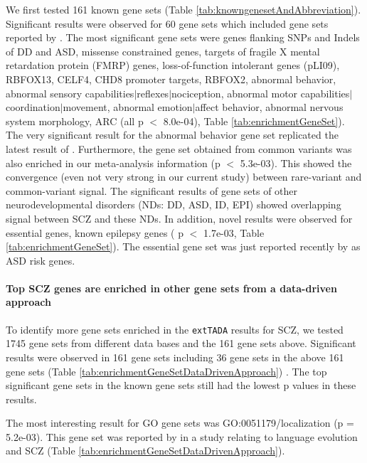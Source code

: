 \documentclass[]{article}
\begin{document}
We first tested 161 known gene sets
(Table \ref{tab:knowngenesetAndAbbreviation}).
Significant results
were observed for 60 gene sets which included gene sets reported by \cite{genovese2016increased}. The most significant gene sets were genes flanking SNPs
and Indels of DD and ASD, missense constrained genes, targets
of fragile X mental retardation protein (FMRP)
genes, loss-of-function intolerant genes (pLI09), RBFOX13, CELF4, CHD8 promoter targets,
RBFOX2, abnormal behavior, abnormal sensory
capabilities$|$reflexes$|$nociception, abnormal motor
capabilities$|$coordination$|$movement, abnormal emotion$|$affect
behavior, abnormal nervous system morphology, ARC (all p $<$ 8.0e-04), Table
\ref{tab:enrichmentGeneSet}). The very significant
result for the abnormal behavior gene set replicated the latest result of
\cite{pardinas2016common}. Furthermore, the gene set obtained from
common variants \citep{pardinas2016common} was also enriched in our
meta-analysis information (p $<$ 5.3e-03). This showed the convergence
(even not very strong in our current study) between
rare-variant and common-variant signal.
The significant results of gene sets of other
neurodevelopmental disorders (NDs: DD, ASD, ID, EPI) showed overlapping
signal between SCZ and these NDs.
In addition, novel results were observed
for essential genes, known epilepsy genes ( p $<$ 1.7e-03, Table
\ref{tab:enrichmentGeneSet}). The essential gene set was just reported
recently by \cite{ji2016increased} as ASD risk genes.


\paragraph{Top SCZ genes are enriched in other gene sets from a
  data-driven approach}

To identify more gene sets enriched in the \texttt{extTADA} results
for SCZ,
we tested 1745 gene sets from different data bases and the 161 gene
sets above. Significant results were observed in 161 gene sets including 36 gene sets in the
 above 161 gene sets (Table \ref{tab:enrichmentGeneSetDataDrivenApproach})
. The top significant gene sets in the known gene sets still had the
lowest p values in these results.

The most interesting result for GO gene
sets was GO:0051179/localization (p = 5.2e-03). This gene set was reported by
\cite{murphy2016bridging} in a study relating to language
evolution and SCZ (Table \ref{tab:enrichmentGeneSetDataDrivenApproach}).
\end{document}
